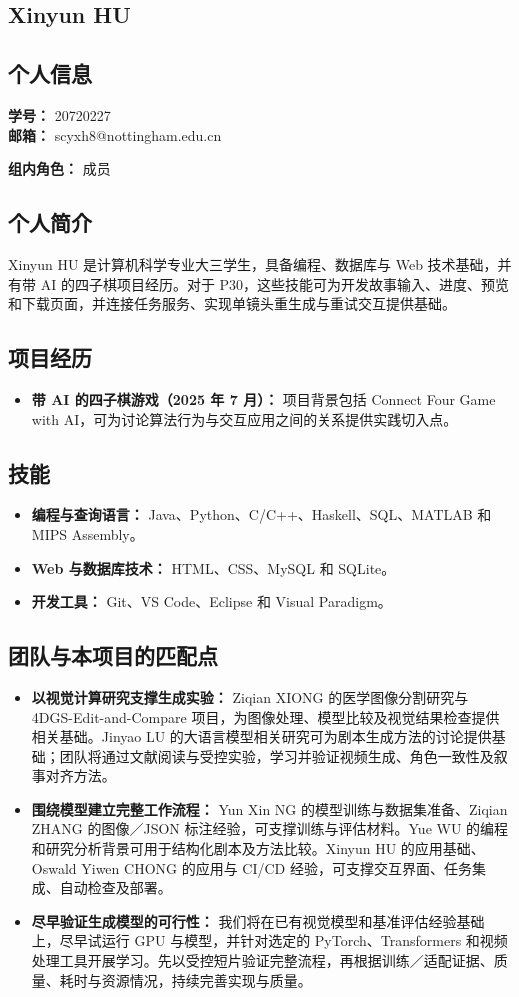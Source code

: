 \documentclass[a4paper,12pt]{article}
\newcommand{\PersonalInformation}[2]{%
  \subsection*{个人信息}
  \if\relax\detokenize{#1}\relax\else
  \noindent\textbf{学号：} #1\\
  \fi
  \textbf{邮箱：} #2\par
}
\begin{document}
\subsection{Xinyun HU}
\PersonalInformation{20720227}{scyxh8@nottingham.edu.cn}
\noindent\textbf{组内角色：} 成员\par

\subsection*{个人简介}
Xinyun HU 是计算机科学专业大三学生，具备编程、数据库与 Web 技术基础，并有带 AI 的四子棋项目经历。对于 P30，这些技能可为开发故事输入、进度、预览和下载页面，并连接任务服务、实现单镜头重生成与重试交互提供基础。

\subsection*{项目经历}
\begin{itemize}
  \item \textbf{带 AI 的四子棋游戏（2025 年 7 月）：} 项目背景包括 Connect Four Game with AI，可为讨论算法行为与交互应用之间的关系提供实践切入点。
\end{itemize}

\subsection*{技能}
\begin{itemize}
  \item \textbf{编程与查询语言：} Java、Python、C/C++、Haskell、SQL、MATLAB 和 MIPS Assembly。
  \item \textbf{Web 与数据库技术：} HTML、CSS、MySQL 和 SQLite。
  \item \textbf{开发工具：} Git、VS Code、Eclipse 和 Visual Paradigm。
\end{itemize}

\subsection{团队与本项目的匹配点}
\begin{itemize}
  \item \textbf{以视觉计算研究支撑生成实验：} Ziqian XIONG 的医学图像分割研究与 4DGS-Edit-and-Compare 项目，为图像处理、模型比较及视觉结果检查提供相关基础。Jinyao LU 的大语言模型相关研究可为剧本生成方法的讨论提供基础；团队将通过文献阅读与受控实验，学习并验证视频生成、角色一致性及叙事对齐方法。
  \item \textbf{围绕模型建立完整工作流程：} Yun Xin NG 的模型训练与数据集准备、Ziqian ZHANG 的图像／JSON 标注经验，可支撑训练与评估材料。Yue WU 的编程和研究分析背景可用于结构化剧本及方法比较。Xinyun HU 的应用基础、Oswald Yiwen CHONG 的应用与 CI/CD 经验，可支撑交互界面、任务集成、自动检查及部署。
  \item \textbf{尽早验证生成模型的可行性：} 我们将在已有视觉模型和基准评估经验基础上，尽早试运行 GPU 与模型，并针对选定的 PyTorch、Transformers 和视频处理工具开展学习。先以受控短片验证完整流程，再根据训练／适配证据、质量、耗时与资源情况，持续完善实现与质量。
\end{itemize}
\end{document}
